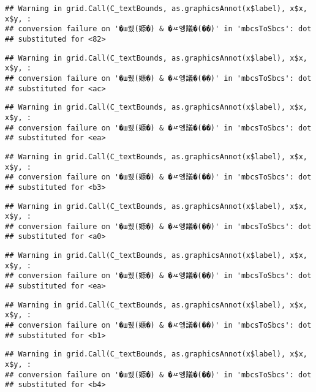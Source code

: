 \documentclass[
]{article}
\begin{document}
\begin{verbatim}
## Warning in grid.Call(C_textBounds, as.graphicsAnnot(x$label), x$x, x$y, :
## conversion failure on '�ш퀬(嫄�) & �ㅼ엥議�(��)' in 'mbcsToSbcs': dot
## substituted for <82>
\end{verbatim}

\begin{verbatim}
## Warning in grid.Call(C_textBounds, as.graphicsAnnot(x$label), x$x, x$y, :
## conversion failure on '�ш퀬(嫄�) & �ㅼ엥議�(��)' in 'mbcsToSbcs': dot
## substituted for <ac>
\end{verbatim}

\begin{verbatim}
## Warning in grid.Call(C_textBounds, as.graphicsAnnot(x$label), x$x, x$y, :
## conversion failure on '�ш퀬(嫄�) & �ㅼ엥議�(��)' in 'mbcsToSbcs': dot
## substituted for <ea>
\end{verbatim}

\begin{verbatim}
## Warning in grid.Call(C_textBounds, as.graphicsAnnot(x$label), x$x, x$y, :
## conversion failure on '�ш퀬(嫄�) & �ㅼ엥議�(��)' in 'mbcsToSbcs': dot
## substituted for <b3>
\end{verbatim}

\begin{verbatim}
## Warning in grid.Call(C_textBounds, as.graphicsAnnot(x$label), x$x, x$y, :
## conversion failure on '�ш퀬(嫄�) & �ㅼ엥議�(��)' in 'mbcsToSbcs': dot
## substituted for <a0>
\end{verbatim}

\begin{verbatim}
## Warning in grid.Call(C_textBounds, as.graphicsAnnot(x$label), x$x, x$y, :
## conversion failure on '�ш퀬(嫄�) & �ㅼ엥議�(��)' in 'mbcsToSbcs': dot
## substituted for <ea>
\end{verbatim}

\begin{verbatim}
## Warning in grid.Call(C_textBounds, as.graphicsAnnot(x$label), x$x, x$y, :
## conversion failure on '�ш퀬(嫄�) & �ㅼ엥議�(��)' in 'mbcsToSbcs': dot
## substituted for <b1>
\end{verbatim}

\begin{verbatim}
## Warning in grid.Call(C_textBounds, as.graphicsAnnot(x$label), x$x, x$y, :
## conversion failure on '�ш퀬(嫄�) & �ㅼ엥議�(��)' in 'mbcsToSbcs': dot
## substituted for <b4>
\end{verbatim}
\end{document}
